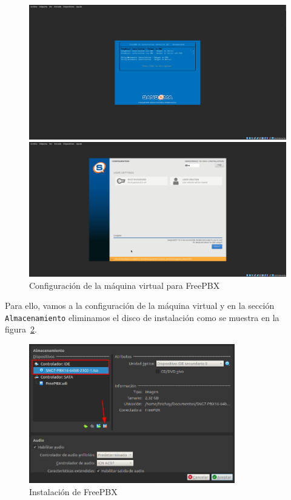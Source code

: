 \begin{figure}[H]
    \centering
    \begin{minipage}{0.49\textwidth}
        \centering
        \includegraphics[width=\textwidth]{images/freepbx_installation_1.png}
    \end{minipage}\hfill
    \begin{minipage}{0.49\textwidth}
        \centering
        \includegraphics[width=\textwidth]{images/freepbx_installation_5.png}
    \end{minipage}
		\caption{Configuración de la máquina virtual para FreePBX}
		\label{fig:freepbx_installation_1}
\end{figure}

\noindent
Para ello, vamos a la configuración de la máquina virtual y en la sección \texttt{Almacenamiento} eliminamos el disco de instalación como se muestra en la figura~\ref{fig:freepbx_installation_6}.

\begin{figure}[H]
	\centering
	\includegraphics[width=0.8\textwidth]{images/freepbx_installation_6.png}
	\caption{Instalación de FreePBX}
	\label{fig:freepbx_installation_6}
\end{figure}

